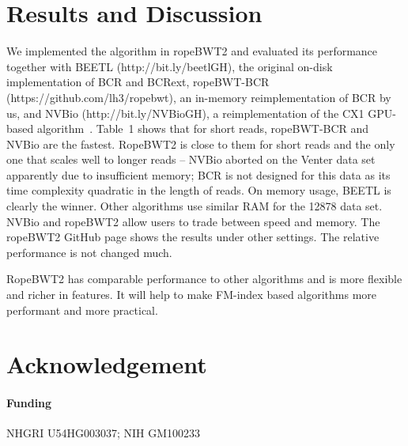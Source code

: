 \documentclass{bioinfo}
\begin{document}
\vspace*{-1em}
\section{Results and Discussion}
We implemented the algorithm in ropeBWT2 and evaluated its performance
together with BEETL (http://bit.ly/beetlGH), the original on-disk
implementation of BCR and BCRext, ropeBWT-BCR (https://github.com/lh3/ropebwt),
an in-memory reimplementation of BCR by us, and NVBio (http://bit.ly/NVBioGH), a
reimplementation of the CX1 GPU-based algorithm~\citep{DBLP:journals/corr/LiuLL14}.
Table~1 shows that for short reads, ropeBWT-BCR and NVBio are the fastest.
RopeBWT2 is close to them for short reads and the only one that scales well to
longer reads -- NVBio aborted on the Venter data set apparently due to
insufficient memory; BCR is not designed for this data as its time complexity
quadratic in the length of reads. On memory usage, BEETL is clearly the winner.
Other algorithms use similar RAM for the 12878 data set. NVBio and ropeBWT2
allow users to trade between speed and memory. The ropeBWT2 GitHub page shows
the results under other settings.  The relative performance is not changed
much.

RopeBWT2 has comparable performance to other algorithms and is more flexible
and richer in features. It will help to make FM-index based algorithms more
performant and more practical.
\vspace*{-1em}
\section*{Acknowledgement}
\paragraph{Funding\textcolon} NHGRI U54HG003037; NIH GM100233


\end{document}
